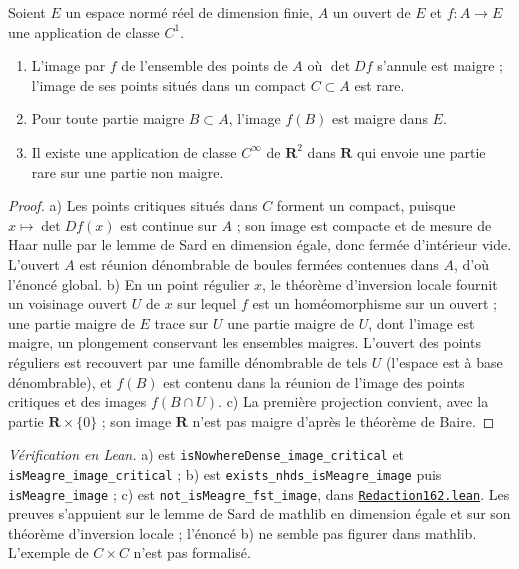 \begin{encadre}
\begin{theoreme}\mbox{}
Soient $E$ un espace normé réel de dimension finie, $A$ un ouvert de $E$ et $f : A \to E$ une application de classe $C^1$.
\begin{enumerate}
\item[a)] L'image par $f$ de l'ensemble des points de $A$ où $\det Df$ s'annule est maigre ; l'image de ses points situés dans un compact $C \subset A$ est rare.
\item[b)] Pour toute partie maigre $B \subset A$, l'image $f(B)$ est maigre dans $E$.
\item[c)] Il existe une application de classe $C^\infty$ de $\mathbf R^2$ dans $\mathbf R$ qui envoie une partie rare sur une partie non maigre.
\end{enumerate}
\end{theoreme}
\end{encadre}

\begin{proof}
a) Les points critiques situés dans $C$ forment un compact, puisque $x \mapsto \det Df(x)$ est continue sur $A$ ; son image est compacte et de mesure de Haar nulle par le lemme de Sard en dimension égale, donc fermée d'intérieur vide. L'ouvert $A$ est réunion dénombrable de boules fermées contenues dans $A$, d'où l'énoncé global. b) En un point régulier $x$, le théorème d'inversion locale fournit un voisinage ouvert $U$ de $x$ sur lequel $f$ est un homéomorphisme sur un ouvert ; une partie maigre de $E$ trace sur $U$ une partie maigre de $U$, dont l'image est maigre, un plongement conservant les ensembles maigres. L'ouvert des points réguliers est recouvert par une famille dénombrable de tels $U$ (l'espace est à base dénombrable), et $f(B)$ est contenu dans la réunion de l'image des points critiques et des images $f(B \cap U)$. c) La première projection convient, avec la partie $\mathbf R \times \{0\}$ ; son image $\mathbf R$ n'est pas maigre d'après le théorème de Baire.
\end{proof}

\begin{sloppypar}
\noindent\emph{Vérification en Lean.} a) est \texttt{isNowhereDense\_image\_critical} et \texttt{isMeagre\_image\_critical} ; b) est \texttt{exists\_nhds\_isMeagre\_image} puis \texttt{isMeagre\_image} ; c) est \texttt{not\_isMeagre\_fst\_image}, dans \href{\leanblobmain/Redaction162.lean}{\texttt{Redaction162.\allowbreak{}lean}}. Les preuves s'appuient sur le lemme de Sard de mathlib en dimension égale et sur son théorème d'inversion locale ; l'énoncé b) ne semble pas figurer dans mathlib. L'exemple de $C \times C$ n'est pas formalisé.
\end{sloppypar}

